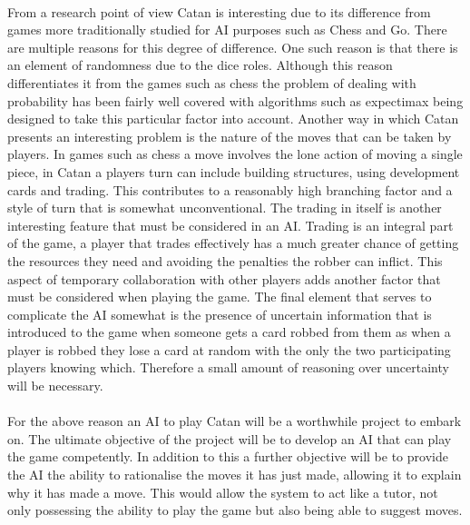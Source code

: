 \documentclass[]{article}
\begin{document}
\paragraph{}
From a research point of view Catan is interesting due to its difference from games more traditionally studied for AI purposes such as Chess and Go. There are multiple reasons for this degree of difference. One such reason is that there is an element of randomness due to the dice roles. Although this reason differentiates it from the games such as chess the problem of dealing with probability has been fairly well covered with algorithms such as expectimax being designed to take this particular factor into account. Another way in which Catan presents an interesting problem is the nature of the moves that can be taken by players. In games such as chess a move involves the lone action of moving a single piece, in Catan a players turn can include building structures, using development cards and trading. This contributes to a reasonably high branching factor and a style of turn that is somewhat unconventional. The trading in itself is another interesting feature that must be considered in an AI. Trading is an integral part of the game, a player that trades effectively has a much greater chance of getting the resources they need and avoiding the penalties the robber can inflict. This aspect of temporary collaboration with other players adds another factor that must be considered when playing the game. The final element that serves to complicate the AI somewhat is the presence of uncertain information that is introduced to the game when someone gets a card robbed from them as when a player is robbed they lose a card at random with the only the two participating players knowing which. Therefore a small amount of reasoning over uncertainty will be necessary.

\paragraph{}
For the above reason an AI to play Catan will be a worthwhile project to embark on. The ultimate objective of the project will be to develop an AI that can play the game competently. In addition to this a further objective will be to provide the AI the ability to rationalise the moves it has just made, allowing it to explain why it has made a move. This would allow the system to act like a tutor, not only possessing the ability to play the game but also being able to suggest moves. 
\end{document}
